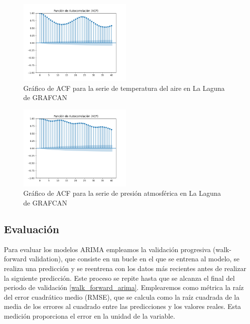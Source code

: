 \begin{figure}[H]
    \centering
    \includegraphics[width=0.5\textwidth]{images/arima_acf_temp.png}
    \caption{Gráfico de ACF para la serie de temperatura del aire en La Laguna de GRAFCAN}
    \label{acf_arima_temp}
\end{figure}

\begin{figure}[H]
    \centering
    \includegraphics[width=0.5\textwidth]{images/arima_acf_pres.png}
    \caption{Gráfico de ACF para la serie de presión atmosférica en La Laguna de GRAFCAN}
    \label{acf_arima_pres}
\end{figure}

\subsection{Evaluación}
Para evaluar los modelos ARIMA empleamos la validación progresiva (walk-forward validation), que consiste en un bucle en el que se entrena al modelo, se realiza una predicción y se reentrena con los datos más recientes
antes de realizar la siguiente predicción. Este proceso se repite hasta que se alcanza el final del periodo de validación \ref{walk_forward_arima}. Emplearemos como métrica la raíz del error cuadrático medio (RMSE), 
que se calcula como la raíz cuadrada de la media de los errores al cuadrado entre las predicciones y los valores reales. Esta medición proporciona el error en la unidad de la variable.

